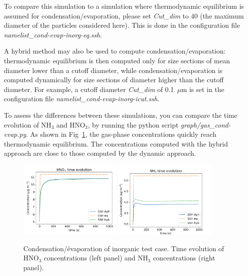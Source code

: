 \documentclass[a4paper,11pt]{article}
\begin{document}
To compare this simulation to a simulation where thermodynamic equilibrium is assumed for condensation/evaporation, please set  {\it{Cut\_dim}} to 40 (the maximum diameter of the particles considered here). 
This is done in the configuration file {\it{namelist\_cond-evap-inorg-eq.ssh}}.

A hybrid method may also be used to compute condensation/evaporation: thermodynamic equilibrium is then computed only for size sections of mean diameter lower than a cutoff diameter, while condensation/evaporation is computed dynamically for size sections of diameter higher than the cutoff diameter. For example, a cutoff diameter {\it{Cut\_dim}} of 0.1~$\mu$m is set in the configuration file {\it{namelist\_cond-evap-inorg-icut.ssh}}.


To assess the differences between these simulations, you can compare the time evolution of NH$_3$ and HNO$_3$, 
by running the python script {\it{graph/gas\_cond-evap.py}}. As shown in
Fig~\ref{fig-cond-evap}, the gas-phase concentrations quickly reach
thermodynamic equilibrium. The concentrations computed with the hybrid approach are close to those computed by the dynamic approach.


\begin{figure}[H]
        \begin{center}
                \includegraphics[angle=0,width=0.45\textwidth]{../graph/figure_ref/HNO3_COND-EVAP_time.png}
                \includegraphics[angle=0,width=0.45\textwidth]{../graph/figure_ref/NH3_COND-EVAP_time.png}
        \end{center}
\caption{Condensation/\'evaporation of inorganic test case. Time evolution of
  HNO$_3$ concentrations (left panel) and NH$_3$ concentrations (right panel).}
\label{fig-cond-evap}
\end{figure}
       
\end{document}
